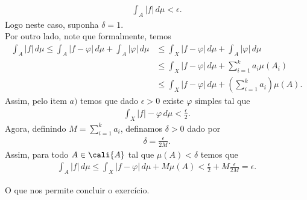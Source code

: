 \begin{homeworkProblem}[5]
\begin{solution}
\begin{enumerate}[a)]
      \begin{align*}
        \int_{A}|f|\,d\mu<\epsilon.
      \end{align*}
      Logo neste caso, suponha $\delta=1$.\\
      Por outro lado, note que formalmente, temos
      \begin{align*}
        \int_{A}|f|\,d\mu\leq \int_{A}|f-\varphi|\,d\mu+\int_{A}|\varphi|\,d\mu
        &\leq \int_{X}|f-\varphi|\,d\mu+\int_{A}|\varphi|\,d\mu\\
        &\leq \int_{X}|f-\varphi|\,d\mu+\sum_{i=1}^{k}a_i\mu(A_i)\\
        &\leq  \int_{X}|f-\varphi|\,d\mu +\left(\sum_{i=1}^{k}a_i\right)\mu(A).
      \end{align*}
      Assim, pelo item $a)$ temos que dado $\epsilon>0$ existe $\varphi$ simples tal que
      \begin{align*}
        \int_{X}|f|-\varphi\,d\mu<\frac{\epsilon}{2}.
      \end{align*}
      Agora, definindo $M=\sum_{i=1}^{k}a_i$, definamos $\delta>0$ dado por
      \begin{align*}
        \delta=\frac{\epsilon}{2M}.
      \end{align*}
      Assim, para todo $A\in\cali{A}$ tal que $\mu(A)<\delta$ temos que
      \begin{align*}
        \int_{A}|f|\,d\mu\leq \int_{X}|f-\varphi|\,d\mu+ M\mu(A)< \frac{\epsilon}{2}+M\frac{\epsilon}{2M}=\epsilon.
      \end{align*}
  \end{enumerate}
    O que nos permite concluir o exercício.
  \end{solution}
\end{homeworkProblem}
